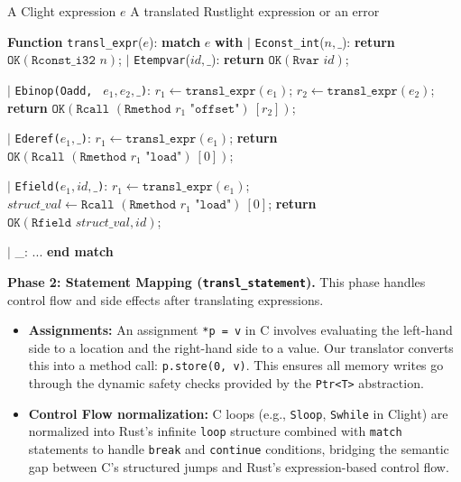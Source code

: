 \documentclass{llncs} %
\begin{document}
\begin{algorithm}[!ht]
\caption{Core Recursive Translation Logic in \texttt{transl\_expr}}
\label{alg:translation}
\footnotesize
\begin{algorithmic}[1]
\Require A Clight expression $e$
\Ensure A translated Rustlight expression or an error

\Statex \textbf{Function} \texttt{transl\_expr}($e$):
\State \textbf{match} $e$ \textbf{with}
    \State \quad $|$ \texttt{Econst\_int}($n, \_$): \quad\quad \textbf{return} $\texttt{OK}(\texttt{Rconst\_i32 } n)$;
    \State \quad $|$ \texttt{Etempvar}($id, \_$): \quad\quad \textbf{return} $\texttt{OK}(\texttt{Rvar } id)$;
    
    \State \quad $|$ \texttt{Ebinop(Oadd, } $e_1, e_2, \_$\texttt{)}: 
        \State \quad\quad $r_1 \gets \texttt{transl\_expr}(e_1)$; 
        \quad $r_2 \gets \texttt{transl\_expr}(e_2)$;
        \State \quad\quad \textbf{return} $\texttt{OK}(\texttt{Rcall } (\texttt{Rmethod } r_1 \texttt{ "offset"}) \ [r_2])$;
    
    \State \quad $|$ \texttt{Ederef(}$e_1, \_$\texttt{)}: 
        \State \quad\quad $r_1 \gets \texttt{transl\_expr}(e_1)$;
        \quad \textbf{return} $\texttt{OK}(\texttt{Rcall } (\texttt{Rmethod } r_1 \texttt{ "load"}) \ [0])$;
    
    \State \quad $|$ \texttt{Efield(}$e_1, id, \_$\texttt{)}: 
        \State \quad\quad $r_1 \gets \texttt{transl\_expr}(e_1)$;
        \quad $struct\_val \gets \texttt{Rcall } (\texttt{Rmethod } r_1 \texttt{ "load"}) \ [0]$;
        \State \quad\quad \textbf{return} $\texttt{OK}(\texttt{Rfield } struct\_val, id)$;

    \State \quad $|$ \_: 
     ...
\State \textbf{end match}
\end{algorithmic}

\end{algorithm}

\textbf{Phase 2: Statement Mapping (\texttt{transl\_statement}).}
This phase handles control flow and side effects after translating expressions.
\begin{itemize}
    \item \textbf{Assignments:} An assignment \texttt{*p = v} in C involves evaluating the left-hand side to a location and the right-hand side to a value. Our translator converts this into a method call: \texttt{p.store(0, v)}. This ensures all memory writes go through the dynamic safety checks provided by the \texttt{Ptr<T>} abstraction.
    \item \textbf{Control Flow normalization:} C loops (e.g., \texttt{Sloop}, \texttt{Swhile} in Clight) are normalized into Rust's infinite \texttt{loop} structure combined with \texttt{match} statements to handle \texttt{break} and \texttt{continue} conditions, bridging the semantic gap between C's structured jumps and Rust's expression-based control flow.
\end{itemize}
\end{document}
